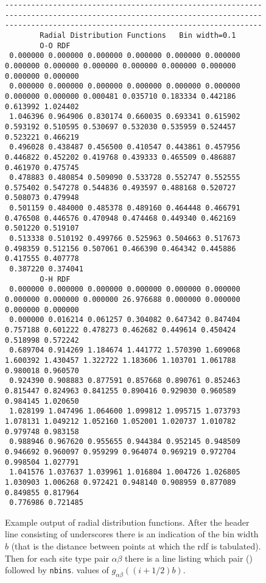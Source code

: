 \begin{figure}
\caption[Example output of radial distribution functions.]{Example
output of radial distribution functions. After the header line
consisting of underscores there is an indication of the bin width $b$
(that is the distance between points at which the rdf is tabulated).
Then for each site type pair $\alpha\beta$ there is a line listing
which pair () followed by {\tt nbins}.  values of
$g_{\alpha\beta}((i+1/2)b)$.  }
\label{fig:rdf-output}
\begin{tiny}
\begin{verbatim}
---------------------------------------------------------------------------------------------------------------------------------------------------------------------------------
        Radial Distribution Functions   Bin width=0.1
        O-O RDF
 0.000000 0.000000 0.000000 0.000000 0.000000 0.000000 0.000000 0.000000 0.000000 0.000000 0.000000 0.000000 0.000000 0.000000
 0.000000 0.000000 0.000000 0.000000 0.000000 0.000000 0.000000 0.000000 0.000481 0.035710 0.183334 0.442186 0.613992 1.024402
 1.046396 0.964906 0.830174 0.660035 0.693341 0.615902 0.593192 0.510595 0.530697 0.532030 0.535959 0.524457 0.523221 0.466219
 0.496028 0.438487 0.456500 0.410547 0.443861 0.457956 0.446822 0.452202 0.419768 0.439333 0.465509 0.486887 0.461970 0.475745
 0.478883 0.480854 0.509090 0.533728 0.552747 0.552555 0.575402 0.547278 0.544836 0.493597 0.488168 0.520727 0.508073 0.479948
 0.501159 0.484000 0.485378 0.489160 0.464448 0.466791 0.476508 0.446576 0.470948 0.474468 0.449340 0.462169 0.501220 0.519107
 0.513338 0.510192 0.499766 0.525963 0.504663 0.517673 0.498359 0.512156 0.507061 0.466390 0.464342 0.445886 0.417555 0.407778
 0.387220 0.374041
        O-H RDF
 0.000000 0.000000 0.000000 0.000000 0.000000 0.000000 0.000000 0.000000 0.000000 26.976688 0.000000 0.000000 0.000000 0.000000
 0.000000 0.016214 0.061257 0.304082 0.647342 0.847404 0.757188 0.601222 0.478273 0.462682 0.449614 0.450424 0.518998 0.572242
 0.689704 0.914269 1.184674 1.441772 1.570390 1.609068 1.600392 1.430457 1.322722 1.183606 1.103701 1.061788 0.980018 0.960570
 0.924390 0.908883 0.877591 0.857668 0.890761 0.852463 0.815447 0.824963 0.841255 0.890416 0.929030 0.960589 0.984145 1.020650
 1.028199 1.047496 1.064600 1.099812 1.095715 1.073793 1.078131 1.049212 1.052160 1.052001 1.020737 1.010782 0.979748 0.983158
 0.988946 0.967620 0.955655 0.944384 0.952145 0.948509 0.946692 0.960097 0.959299 0.964074 0.969219 0.972704 0.998504 1.027791
 1.041576 1.037637 1.039961 1.016804 1.004726 1.026805 1.030903 1.006268 0.972421 0.948140 0.908959 0.877089 0.849855 0.817964
 0.776986 0.721485

\end{verbatim}
\end{tiny}
\end{figure}

